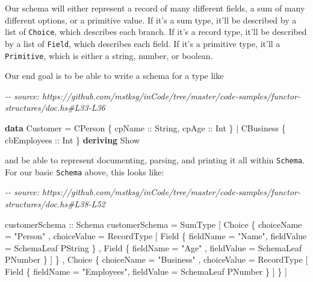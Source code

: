 \documentclass[]{article}
\newenvironment{Shaded}{}{}
\newcommand{\CommentTok}[1]{\textcolor[rgb]{0.38,0.63,0.69}{\textit{#1}}}
\newcommand{\DataTypeTok}[1]{\textcolor[rgb]{0.56,0.13,0.00}{#1}}
\newcommand{\KeywordTok}[1]{\textcolor[rgb]{0.00,0.44,0.13}{\textbf{#1}}}
\newcommand{\NormalTok}[1]{#1}
\newcommand{\OperatorTok}[1]{\textcolor[rgb]{0.40,0.40,0.40}{#1}}
\newcommand{\OtherTok}[1]{\textcolor[rgb]{0.00,0.44,0.13}{#1}}
\newcommand{\StringTok}[1]{\textcolor[rgb]{0.25,0.44,0.63}{#1}}
\begin{document}
Our schema will either represent a record of many different fields, a sum of
many different options, or a primitive value. If it's a sum type, it'll be
described by a list of \texttt{Choice}, which describes each branch. If it's a
record type, it'll be described by a list of \texttt{Field}, which describes
each field. If it's a primitive type, it'll a \texttt{Primitive}, which is
either a string, number, or boolean.

Our end goal is to be able to write a schema for a type like

\begin{Shaded}
\begin{Highlighting}[]
\CommentTok{{-}{-} source: https://github.com/mstksg/inCode/tree/master/code{-}samples/functor{-}structures/doc.hs\#L33{-}L36}

\KeywordTok{data} \DataTypeTok{Customer} \OtherTok{=}
      \DataTypeTok{CPerson}\NormalTok{   \{}\OtherTok{ cpName ::} \DataTypeTok{String}\NormalTok{,}\OtherTok{ cpAge ::} \DataTypeTok{Int}\NormalTok{ \}}
    \OperatorTok{|} \DataTypeTok{CBusiness}\NormalTok{ \{}\OtherTok{ cbEmployees ::} \DataTypeTok{Int}\NormalTok{ \}}
  \KeywordTok{deriving} \DataTypeTok{Show}
\end{Highlighting}
\end{Shaded}

and be able to represent documenting, parsing, and printing it all within
\texttt{Schema}. For our basic \texttt{Schema} above, this looks like:

\begin{Shaded}
\begin{Highlighting}[]
\CommentTok{{-}{-} source: https://github.com/mstksg/inCode/tree/master/code{-}samples/functor{-}structures/doc.hs\#L38{-}L52}

\OtherTok{customerSchema ::} \DataTypeTok{Schema}
\NormalTok{customerSchema }\OtherTok{=} \DataTypeTok{SumType}
\NormalTok{    [ }\DataTypeTok{Choice}
\NormalTok{        \{ choiceName  }\OtherTok{=} \StringTok{"Person"}
\NormalTok{        , choiceValue }\OtherTok{=} \DataTypeTok{RecordType}
\NormalTok{            [ }\DataTypeTok{Field}\NormalTok{ \{ fieldName }\OtherTok{=} \StringTok{"Name"}\NormalTok{, fieldValue }\OtherTok{=} \DataTypeTok{SchemaLeaf} \DataTypeTok{PString}\NormalTok{ \}}
\NormalTok{            , }\DataTypeTok{Field}\NormalTok{ \{ fieldName }\OtherTok{=} \StringTok{"Age"}\NormalTok{ , fieldValue }\OtherTok{=} \DataTypeTok{SchemaLeaf} \DataTypeTok{PNumber}\NormalTok{ \}}
\NormalTok{            ]}
\NormalTok{        \}}
\NormalTok{    , }\DataTypeTok{Choice}
\NormalTok{        \{ choiceName  }\OtherTok{=} \StringTok{"Business"}
\NormalTok{        , choiceValue }\OtherTok{=} \DataTypeTok{RecordType}
\NormalTok{            [ }\DataTypeTok{Field}\NormalTok{ \{ fieldName }\OtherTok{=} \StringTok{"Employees"}\NormalTok{, fieldValue }\OtherTok{=} \DataTypeTok{SchemaLeaf} \DataTypeTok{PNumber}\NormalTok{ \} ]}
\NormalTok{        \}}
\NormalTok{    ]}
\end{Highlighting}
\end{Shaded}
\end{document}

